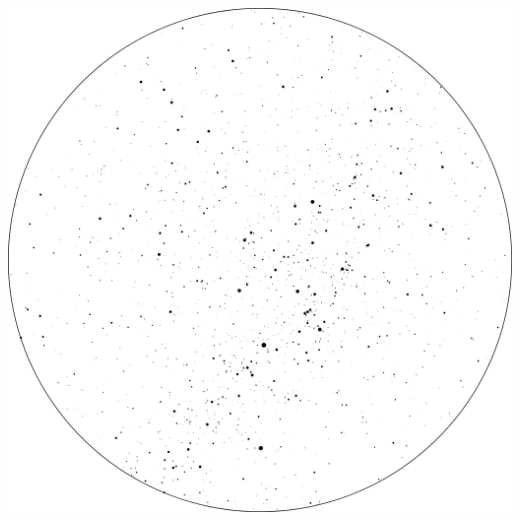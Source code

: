 \documentclass{./SAS-class-skygen}
\begin{document}
	\vspace{0.5cm}
    \begin{center}
    \includegraphics[width=\textwidth]{./pics/skychart2.png}
    \end{center}
    
    
\end{document}
